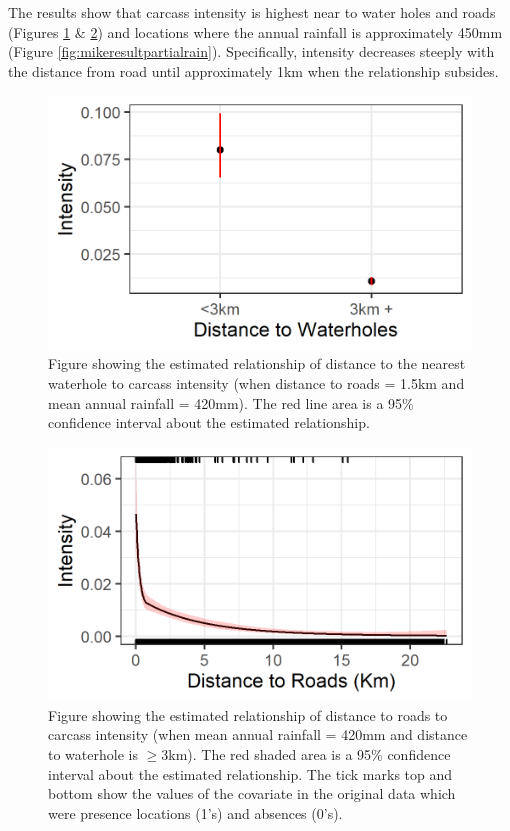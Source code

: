 \documentclass[letterpaper]{interact}
\begin{document}
The results show that carcass intensity is highest near to water holes and roads (Figures \ref{fig:mikeresultpartialwater} \& \ref{fig:mikeresultpartialroad}) and locations where the annual rainfall is approximately 450mm (Figure \ref{fig:mikeresultpartialrain}). Specifically, intensity decreases steeply with the distance from road until approximately 1km when the relationship subsides. 

\begin{figure}[!ht]
\centering
\includegraphics[width=0.7\linewidth]{images/mike_analysis1D_partials_water.jpg}
\caption{Figure showing the estimated relationship of distance to the nearest waterhole to carcass intensity (when distance to roads = 1.5km and mean annual rainfall = 420mm).  The red line area is a 95\% confidence interval about the estimated relationship.}
\label{fig:mikeresultpartialwater}
\end{figure}

\begin{figure}[!ht]
\centering
\includegraphics[width=0.7\linewidth]{images/mike_analysis1D_partials_roads.jpg}
\caption{Figure showing the estimated relationship of distance to roads to carcass intensity (when mean annual rainfall = 420mm and distance to waterhole is $\geq3$km).  The red shaded area is a 95\% confidence interval about the estimated relationship. The tick marks top and bottom show the values of the covariate in the original data which were presence locations (1's) and absences (0's).}
\label{fig:mikeresultpartialroad}
\end{figure}
\end{document}
